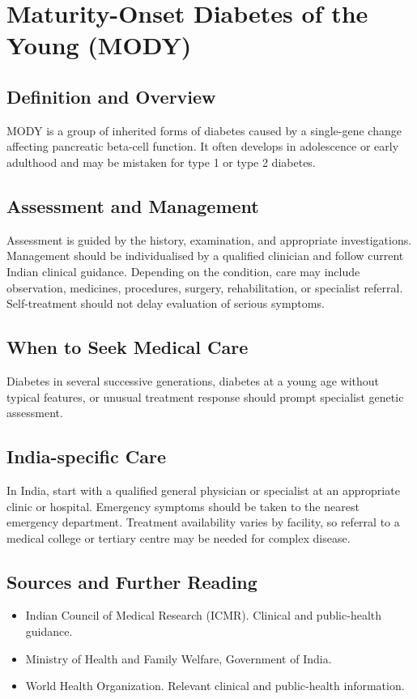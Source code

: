 \chapter{Maturity-Onset Diabetes of the Young (MODY)}

\section*{Definition and Overview}
MODY is a group of inherited forms of diabetes caused by a single-gene change affecting pancreatic beta-cell function. It often develops in adolescence or early adulthood and may be mistaken for type 1 or type 2 diabetes.

\section*{Assessment and Management}
Assessment is guided by the history, examination, and appropriate investigations. Management should be individualised by a qualified clinician and follow current Indian clinical guidance. Depending on the condition, care may include observation, medicines, procedures, surgery, rehabilitation, or specialist referral. Self-treatment should not delay evaluation of serious symptoms.

\section*{When to Seek Medical Care}
Diabetes in several successive generations, diabetes at a young age without typical features, or unusual treatment response should prompt specialist genetic assessment.

\section*{India-specific Care}
In India, start with a qualified general physician or specialist at an appropriate clinic or hospital. Emergency symptoms should be taken to the nearest emergency department. Treatment availability varies by facility, so referral to a medical college or tertiary centre may be needed for complex disease.

\section*{Sources and Further Reading}
\begin{itemize}
    \item Indian Council of Medical Research (ICMR). Clinical and public-health guidance.
    \item Ministry of Health and Family Welfare, Government of India.
    \item World Health Organization. Relevant clinical and public-health information.
\end{itemize}

